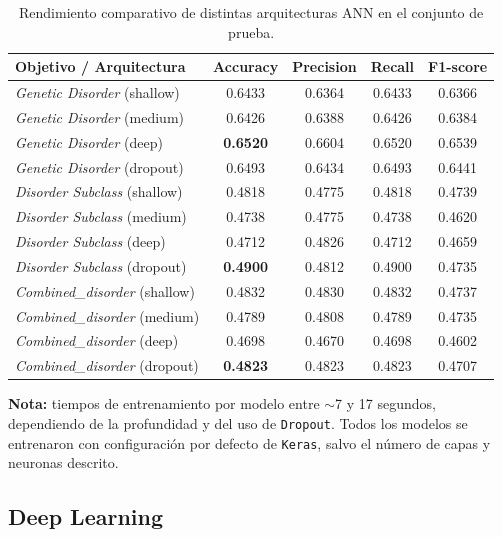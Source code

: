 \documentclass[11pt,a4paper,spanish]{book}
\numberwithin{equation}{chapter}
\numberwithin{figure}{chapter}
\begin{document}
\begin{table}[H]
\centering
\caption{Rendimiento comparativo de distintas arquitecturas ANN en el conjunto de prueba.}
\label{tab:ann-resultados}
\begin{tabular}{lcccc}
\toprule
\textbf{Objetivo / Arquitectura} & \textbf{Accuracy} & \textbf{Precision} & \textbf{Recall} & \textbf{F1-score} \\
\midrule
\textit{Genetic Disorder} (shallow)  & 0.6433 & 0.6364 & 0.6433 & 0.6366 \\
\textit{Genetic Disorder} (medium)   & 0.6426 & 0.6388 & 0.6426 & 0.6384 \\
\textit{Genetic Disorder} (deep)     & \textbf{0.6520} & 0.6604 & 0.6520 & 0.6539 \\
\textit{Genetic Disorder} (dropout)  & 0.6493 & 0.6434 & 0.6493 & 0.6441 \\
\midrule
\textit{Disorder Subclass} (shallow) & 0.4818 & 0.4775 & 0.4818 & 0.4739 \\
\textit{Disorder Subclass} (medium)  & 0.4738 & 0.4775 & 0.4738 & 0.4620 \\
\textit{Disorder Subclass} (deep)    & 0.4712 & 0.4826 & 0.4712 & 0.4659 \\
\textit{Disorder Subclass} (dropout) & \textbf{0.4900} & 0.4812 & 0.4900 & 0.4735 \\
\midrule
\textit{Combined\_disorder} (shallow) & 0.4832 & 0.4830 & 0.4832 & 0.4737 \\
\textit{Combined\_disorder} (medium)  & 0.4789 & 0.4808 & 0.4789 & 0.4735 \\
\textit{Combined\_disorder} (deep)    & 0.4698 & 0.4670 & 0.4698 & 0.4602 \\
\textit{Combined\_disorder} (dropout) & \textbf{0.4823} & 0.4823 & 0.4823 & 0.4707 \\
\bottomrule
\end{tabular}

\vspace{0.5em}
\footnotesize
\textbf{Nota:} tiempos de entrenamiento por modelo entre $\sim$7 y 17 segundos, dependiendo de la
profundidad y del uso de \texttt{Dropout}. Todos los modelos se entrenaron con configuración por
defecto de \texttt{Keras}, salvo el número de capas y neuronas descrito.
\end{table}

\subsection{Deep Learning}
\label{subsec:deep-learning}
\end{document}

